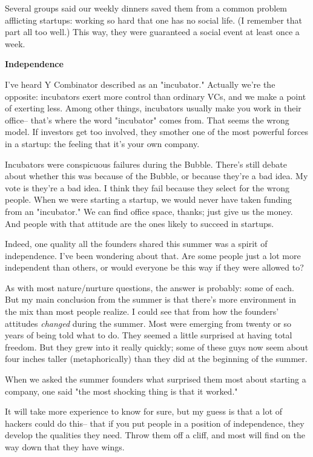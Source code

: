 Several groups said our weekly dinners saved them from a common
problem afflicting startups: working so hard that one has no social
life.  (I remember that part all too well.)  This way, they were
guaranteed a social event at least once a week.

\textbf{Independence}

I've heard Y Combinator described as an "incubator."  Actually we're
the opposite: incubators exert more control than ordinary VCs, and
we make a point of exerting less.  Among other things, incubators
usually make you work in their office-- that's where the 
word "incubator" comes from.  That seems the wrong model.  If
investors get too involved, they smother one of the most powerful 
forces in a startup: the feeling that it's your own company.

Incubators were conspicuous failures during the Bubble.  There's  
still debate about whether this was because of the Bubble, or because
they're a bad idea.  My vote is they're a bad idea.  I think they 
fail because they select for the wrong people.  When we were starting
a startup, we would never have taken funding from an "incubator."
We can find office space, thanks; just give us the money.  And  
people with that attitude are the ones likely to succeed in startups.

Indeed, one quality all the founders shared this summer was a spirit
of independence.  I've been wondering about that.  Are some people
just a lot more independent than others, or would everyone be this
way if they were allowed to?

As with most nature/nurture questions, the answer is probably: some
of each.  But my main conclusion from the summer is that there's
more environment in the mix than most people realize.  I could see
that from how the founders' attitudes \emph{changed} during the   
summer.  Most were emerging from twenty or so years of being told
what to do.  They seemed a little surprised at having total freedom.
But they grew into it really quickly; some of these guys now seem
about four inches taller (metaphorically) than they did at the
beginning of the summer.

When we asked the summer founders what surprised them most about
starting a company, one said "the most shocking thing is that it 
worked."

It will take more experience to know for sure, but my guess is that
a lot of hackers could do this-- that if you put people in a position
of independence, they develop the qualities they need.  Throw them
off a cliff, and most will find on the way down that they have   
wings.

